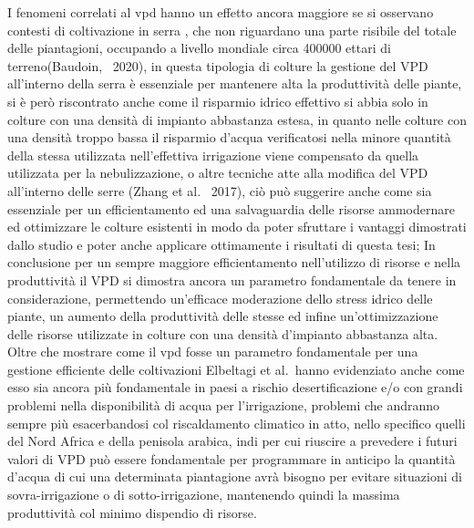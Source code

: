 I fenomeni correlati al vpd hanno un effetto ancora maggiore se si osservano contesti di coltivazione in serra , che non riguardano una parte risibile del totale delle piantagioni, occupando a livello mondiale circa 400000 ettari di terreno(Baudoin,~\cite{baudoin2020greenhouses} 2020), in questa tipologia di colture la gestione del VPD all'interno della serra è essenziale per mantenere alta la produttività delle piante, si è però riscontrato anche come il risparmio idrico effettivo si abbia solo in colture con una densità di impianto abbastanza estesa, in quanto nelle colture con una densità troppo bassa il risparmio d'acqua verificatosi nella minore quantità della stessa utilizzata nell'effettiva irrigazione viene compensato da quella utilizzata per la nebulizzazione, o altre tecniche atte alla modifica del VPD all'interno delle serre (Zhang et al.~\cite{zhang2017vpd} 2017), ciò può suggerire anche come sia essenziale per un efficientamento ed una salvaguardia delle risorse ammodernare ed ottimizzare le colture esistenti in modo da poter sfruttare i vantaggi dimostrati dallo studio e poter anche applicare ottimamente i risultati di questa tesi; In conclusione per un sempre maggiore efficientamento nell'utilizzo di risorse e nella produttività il VPD si dimostra ancora un parametro fondamentale da tenere in considerazione, permettendo un'efficace moderazione dello stress idrico delle piante, un aumento della produttività delle stesse ed infine un'ottimizzazione delle risorse utilizzate in colture con una densità d'impianto abbastanza alta.\\
Oltre che mostrare come il vpd fosse un parametro fondamentale per una gestione efficiente delle coltivazioni Elbeltagi et al.~\cite{elbeltagi2023vpd}hanno evidenziato anche come esso sia ancora più fondamentale in paesi a rischio desertificazione e/o con grandi problemi nella disponibilità di acqua per l'irrigazione, problemi che andranno sempre più esacerbandosi col riscaldamento climatico in atto, nello specifico quelli del Nord Africa e della penisola arabica, indi per cui riuscire a prevedere i futuri valori di VPD può essere fondamentale per programmare in anticipo la quantità d'acqua di cui una determinata piantagione avrà bisogno per evitare situazioni di sovra-irrigazione o di sotto-irrigazione, mantenendo  quindi la massima produttività col minimo dispendio di risorse.\\
